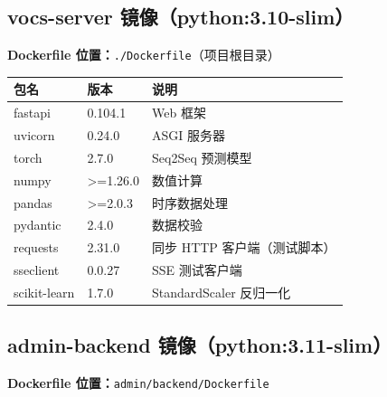 \documentclass[UTF8,a4paper,11pt]{ctexart}
\begin{document}
\subsection{vocs-server 镜像（python:3.10-slim）}

\textbf{Dockerfile 位置：}\texttt{./Dockerfile}（项目根目录）

\begin{longtable}{L{3.5cm} L{2.0cm} L{7.5cm}}
\toprule
\textbf{包名} & \textbf{版本} & \textbf{说明} \\
\midrule
\endhead
fastapi          & 0.104.1 & Web 框架 \\
uvicorn          & 0.24.0  & ASGI 服务器 \\
torch            & 2.7.0   & Seq2Seq 预测模型 \\
numpy            & >=1.26.0 & 数值计算 \\
pandas           & >=2.0.3  & 时序数据处理 \\
pydantic         & 2.4.0    & 数据校验 \\
requests         & 2.31.0   & 同步 HTTP 客户端（测试脚本） \\
sseclient        & 0.0.27   & SSE 测试客户端 \\
scikit-learn     & 1.7.0    & StandardScaler 反归一化 \\
\bottomrule
\end{longtable}

\subsection{admin-backend 镜像（python:3.11-slim）}

\textbf{Dockerfile 位置：}\texttt{admin/backend/Dockerfile}
\end{document}
